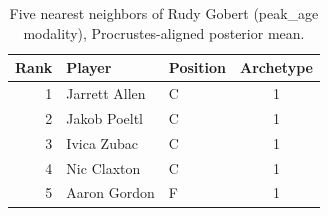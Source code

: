 \begin{table}[htbp]
  \centering\small
  \begin{tabular}{rllc}
    \toprule
    Rank & Player & Position & Archetype \\
    \midrule
    1 & Jarrett Allen & C & 1 \\
    2 & Jakob Poeltl & C & 1 \\
    3 & Ivica Zubac & C & 1 \\
    4 & Nic Claxton & C & 1 \\
    5 & Aaron Gordon & F & 1 \\
    \bottomrule
  \end{tabular}
  \caption{Five nearest neighbors of Rudy Gobert (peak_age modality), Procrustes-aligned posterior mean.}
  \label{tab:Rudy_Gobert_neighbors_peak_age}
\end{table}

